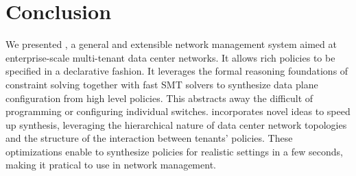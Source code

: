 \section{Conclusion}

We presented \Name, a general and extensible network management system
aimed at enterprise-scale multi-tenant data center networks. It allows
rich policies to be specified in a declarative fashion. It leverages
the formal reasoning foundations of constraint solving together with
fast SMT solvers to synthesize data plane configuration from high
level policies. This abstracts away the difficult of programming or
configuring individual switches. \Name incorporates novel ideas to
speed up synthesis, leveraging the hierarchical nature of data center
network topologies and the structure of the interaction between
tenants' policies. These optimizations enable \Name to synthesize
policies for realistic settings in a few seconds, making it pratical
to use in network management.


